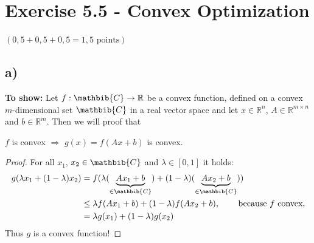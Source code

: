 \documentclass[a4paper]{article}
\begin{document}
    



\newpage
\section*{Exercise 5.5 - Convex Optimization}
$(0,5+0,5+0,5 = 1,5 \text{ points})$
    \subsection*{a)}
        \textbf{To show:}
        Let $f: \mathbib{C} \rightarrow \mathbb{R}$ be a convex function, defined on a convex $m$-dimensional set $\mathbib{C}$ in a real vector space and let $x \in \mathbb{R}^n$, $A \in \mathbb{R}^{m \times n}$ and $b \in \mathbb{R}^m$. Then we will proof that
        \begin{center}
            $f$ is convex $\Rightarrow$ $g(x) = f(Ax + b)$ is convex.
        \end{center}
        \begin{proof}
            For all $x_1$, $x_2 \in \mathbib{C}$ and $\lambda \in [0,1]$ it holds:
            \begin{align}
                g(\lambda x_1 + (1 - \lambda) x_2) &= f(\lambda (\underbrace{A x_1 + b}_{\in \mathbib{C}}) + (1 - \lambda) (\underbrace{A x_2 + b}_{\in \mathbib{C}}))\\
                &\leq \lambda f(A x_1 + b) + (1 - \lambda) f(A x_2 + b) \text{, \ \ \ \ \ \ because $f$ convex,}\\
                &= \lambda g(x_1) + (1 - \lambda) g(x_2)
            \end{align}
            Thus $g$ is a convex function!
        \end{proof}
        
        
        
\end{document}
